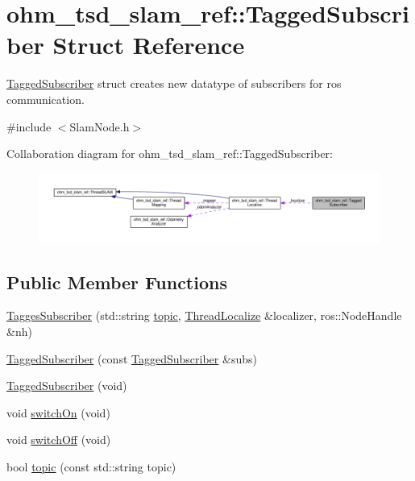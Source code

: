 \hypertarget{structohm__tsd__slam__ref_1_1TaggedSubscriber}{\section{ohm\-\_\-tsd\-\_\-slam\-\_\-ref\-:\-:Tagged\-Subscriber Struct Reference}
\label{structohm__tsd__slam__ref_1_1TaggedSubscriber}
}


\hyperlink{structohm__tsd__slam__ref_1_1TaggedSubscriber}{Tagged\-Subscriber} struct creates new datatype of subscribers for ros communication.  




{\ttfamily \#include $<$Slam\-Node.\-h$>$}



Collaboration diagram for ohm\-\_\-tsd\-\_\-slam\-\_\-ref\-:\-:Tagged\-Subscriber\-:\nopagebreak
\begin{figure}[H]
\begin{center}
\leavevmode
\includegraphics[width=350pt]{structohm__tsd__slam__ref_1_1TaggedSubscriber__coll__graph}
\end{center}
\end{figure}
\subsection*{Public Member Functions}
\begin{DoxyCompactItemize}
\item 
\hyperlink{structohm__tsd__slam__ref_1_1TaggedSubscriber_aa27ec1bb6608bfa803165eb92bf46135}{Tagges\-Subscriber} (std\-::string \hyperlink{structohm__tsd__slam__ref_1_1TaggedSubscriber_a6d4ad13158333a16725cdc1cdd6ab3c2}{topic}, \hyperlink{classohm__tsd__slam__ref_1_1ThreadLocalize}{Thread\-Localize} \&localizer, ros\-::\-Node\-Handle \&nh)
\item 
\hyperlink{structohm__tsd__slam__ref_1_1TaggedSubscriber_aac3521e675e9be4b0d68b96fb7782060}{Tagged\-Subscriber} (const \hyperlink{structohm__tsd__slam__ref_1_1TaggedSubscriber}{Tagged\-Subscriber} \&subs)
\item 
\hyperlink{structohm__tsd__slam__ref_1_1TaggedSubscriber_af58c6641892429bd5d21bdcc5f8f373a}{Tagged\-Subscriber} (void)
\item 
void \hyperlink{structohm__tsd__slam__ref_1_1TaggedSubscriber_a6d95060dc96fb1069588d681668e1420}{switch\-On} (void)
\item 
void \hyperlink{structohm__tsd__slam__ref_1_1TaggedSubscriber_ac41328ef3bb26e0f000f12c989aaf849}{switch\-Off} (void)
\item 
bool \hyperlink{structohm__tsd__slam__ref_1_1TaggedSubscriber_a6d4ad13158333a16725cdc1cdd6ab3c2}{topic} (const std\-::string topic)
\end{DoxyCompactItemize}
